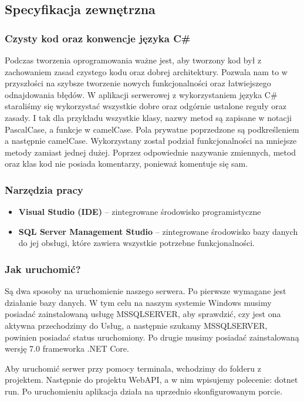 \documentclass[a4paper,twoside,12pt]{book}
\begin{document}
\subsection{Specyfikacja zewnętrzna}
\subsubsection{Czysty kod oraz konwencje języka C\# }
Podczas tworzenia oprogramowania ważne jest, aby tworzony kod był z zachowaniem zasad czystego kodu oraz dobrej architektury. Pozwala nam to w przyszłości na szybsze tworzenie nowych funkcjonalności oraz łatwiejszego odnajdowania błędów. W aplikacji serwerowej z wykorzystaniem języka C\# staraliśmy się wykorzystać wszystkie dobre oraz odgórnie ustalone reguły oraz zasady. I tak dla przykładu wszystkie klasy, nazwy metod są zapisane w notacji PascalCase, a funkcje w camelCase. Pola prywatne poprzedzone są podkreśleniem a następnie camelCase. Wykorzystany został podział funkcjonalności na mniejsze metody zamiast jednej dużej. Poprzez odpowiednie nazywanie zmiennych, metod oraz klas kod nie posiada komentarzy, ponieważ komentuje się sam. 

\subsubsection{Narzędzia pracy}

\begin{itemize}
    \item \textbf{Visual Studio (IDE)} -- zintegrowane środowisko programistyczne  
    \item \textbf{SQL Server Management Studio} -- zintegrowane środowisko bazy danych do jej obsługi, które zawiera wszystkie potrzebne funkcjonalności. 
\end{itemize}

\subsubsection{Jak uruchomić?}
Są dwa sposoby na uruchomienie naszego serwera. Po pierwsze wymagane jest działanie bazy danych. W tym celu na naszym systemie Windows musimy posiadać zainstalowaną usługę MSSQLSERVER, aby sprawdzić, czy jest ona aktywna przechodzimy do Usług, a następnie szukamy MSSQLSERVER, powinien posiadać status uruchomiony. Po drugie musimy posiadać zainstalowaną wersję 7.0 frameworka .NET Core.  

Aby uruchomić serwer przy pomocy terminala, wchodzimy do folderu z projektem. Następnie do projektu WebAPI, a w nim wpisujemy polecenie: dotnet run. Po uruchomieniu aplikacja działa na uprzednio skonfigurowanym porcie. 
\end{document}
